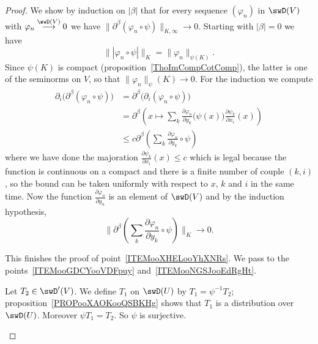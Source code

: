 \begin{proof}
	We show by induction on \( | \beta |\) that for every sequence \( ( \varphi_n)\) in \( \swD(V)\) with \( \varphi_n \stackrel{\swD(V)}{\longrightarrow}0\) we have \(  \| \partial^{\beta}(\varphi_n\circ\psi) \|_{K,\infty}\to 0\). Starting with \( | \beta |=0\) we have
	\begin{equation}
		\| | \varphi_n\circ\psi | \|_K=\| \varphi_n \|_{\psi(K)}.
	\end{equation}
	Since \( \psi(K)\) is compact (proposition~\ref{ThoImCompCotComp}), the latter is one of the seminorms on \( V\), so that \( \| \varphi_n \|_\psi(K)\to 0\). For the induction we compute
	\begin{subequations}
		\begin{align}
			\partial_i\big( \partial^{\beta}(\varphi_n\circ\psi) \big) & =\partial^{\beta}\big( \partial_i(\varphi_n\circ\psi) \big)                                                                                               \\
			                                                           & =\partial^{\beta}\left(  x\mapsto  \sum_k\frac{ \partial \varphi_n }{ \partial y_k }\big( \psi(x)\big)\frac{ \partial \psi_k }{ \partial x_i }(x) \right) \\
			                                                           & \leq c\partial^{\beta}\left( \sum_k\frac{ \partial \varphi_n }{ \partial y_k }\circ\psi \right)
		\end{align}
	\end{subequations}
	where we have done the majoration \( \frac{ \partial \psi_k }{ \partial x_i }(x)\leq c\) which is legal because the function is continuous on a compact and there is a finite number of couple \( (k,i)\), so the bound can be taken uniformly with respect to \( x\), \( k\) and \( i\) in the same time. Now the function \( \frac{ \partial \varphi_n }{ \partial y_n }\) is an element of \( \swD(V)\) and by the induction hypothesis,
	\begin{equation}
		\| \partial^{\beta}\left( \sum_k\frac{ \partial \varphi_n }{ \partial y_k }\circ\psi \right) \|_K\to 0.
	\end{equation}

	This finishes the proof of point~\ref{ITEMooXHELooYhXNRs}. We pass to the points~\ref{ITEMooGDCYooVDFpuy} and~\ref{ITEMooNGSJooEdRgHt}.
	\begin{subproof}

		Let \( T_2\in\swD'(V)\). We define \( T_1\) on \( \swD(U)\) by \( T_1=\psi^{-1} T_2\); proposition~\ref{PROPooXAOKooQSBKHg} shows that \( T_1\) is a distribution over \( \swD(U)\). Moreover \( \psi T_1=T_2\). So \( \psi\) is surjective.


\end{subproof}
\end{proof}
